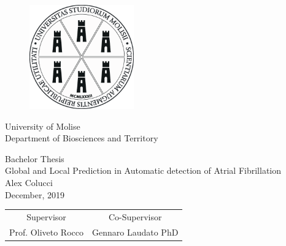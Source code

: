 
\begin{titlepage}
\begin{center}
	\vspace{2em}
	\begin{figure}[htbp]
		\centering
		\includegraphics[width=4.5cm]{./img/logo/unimol_bn.eps} 
	\end{figure}

	\vspace{1em}
	\LARGE{University of Molise}\\
	\vspace{0.5em}
	\Large{Department of Biosciences and Territory}\\
	\vfill
	
	\Large{Bachelor Thesis}\\
	
	\vspace{2em}
	\huge{Global and Local Prediction in Automatic detection of Atrial Fibrillation}\\
	\vspace{0.6em}
	\Large{Alex Colucci}\\
	\Large{December, 2019}
	\vfill
	
	\setlength{\tabcolsep}{1em}
	\begin{table}[htp]
	\centering
	\begin{tabular}{c c}
  		\Large{Supervisor} & \Large{Co-Supervisor} \\
  		\Large{Prof. Oliveto Rocco} & \Large{Gennaro Laudato PhD}\\
	\end{tabular}
	\end{table}
\end{center}
\end{titlepage}
